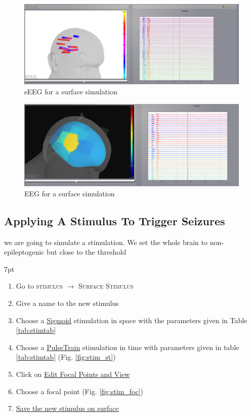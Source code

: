 \documentclass{tufte-handout}
\newenvironment{formal}{%
  \def\FrameCommand{%
    \hspace{1pt}%
    {\color{DarkBlue}\vrule width 2pt}%
    {\color{formalshade}\vrule width 4pt}%
    \colorbox{formalshade}%
  }%
  \MakeFramed{\advance\hsize-\width\FrameRestore}%
  \noindent\hspace{-4.55pt}%
  \begin{adjustwidth}{}{7pt}%
  \vspace{2pt}\vspace{2pt}%
}
{%
  \vspace{2pt}\end{adjustwidth}\endMakeFramed%
}
\begin{document}
\begin{figure}[h]
  \includegraphics[width=\linewidth]{Handout_UI_ModellingAnEpilepticPatient_sEEGSurface}%
  \caption{sEEG for a surface simulation}%
  \label{fig:surf_sEEG}%
\end{figure}

\begin{figure}[h]
  \includegraphics[width=\linewidth]{Handout_UI_ModellingAnEpilepticPatient_EEGSurface}%
  \caption{EEG for a surface simulation}%
  \label{fig:surf_EEG}%
\end{figure}

\subsection{Applying A Stimulus To Trigger Seizures}

 we are going to simulate a stimulation.
We set the whole brain to non-epileptogenic but close to the threshold

  \begin{formal}
  \begin{enumerate}
  \item Go to \textsc{stimulus} $\rightarrow$ \textsc{Surface Stimulus}
  \item Give a name to the new stimulus
  \item Choose a \underline{Sigmoid} stimulation in space with the parameters given in Table \ref{tab:stimtab}
  \item Choose a \underline{PulseTrain} stimulation in time with parameters given in table \ref{tab:stimtab} (Fig. \ref{fig:stim_st})
  \item Click on \underline{Edit Focal Points and View}
  \item Choose a focal point (Fig. \ref{fig:stim_foc})
  \item \underline{Save the new stimulus on surface}
  \end{enumerate}
\end{formal}
\end{document}
